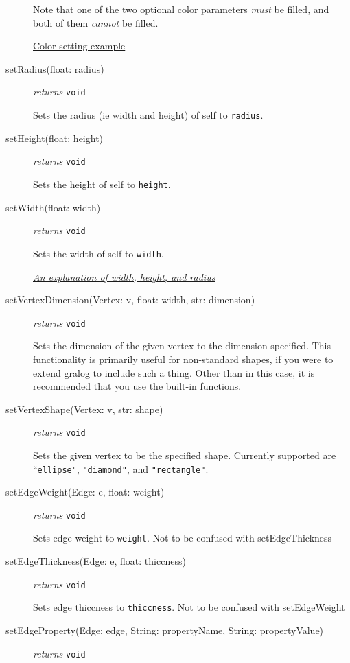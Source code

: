 \documentclass{article}
\newcounter{example}
\begin{document}
\begin{description}
Note that one of the two optional color parameters \textit{must} be filled, and both of them \textit{cannot} be filled.

\hyperref[colorNamesSupportedByGralog]{Color setting example}

\item[setRadius(float: radius)] \emph{returns}
  \texttt{void}

Sets the radius (ie width and height) of self to \texttt{radius}.

\item[setHeight(float: height)] \emph{returns}
  \texttt{void}

Sets the height of self to \texttt{height}.

\item[setWidth(float: width)] \emph{returns}
  \texttt{void}

Sets the width of self to \texttt{width}. 

\hyperref[radiusWidthHeightDiagram]{\textit{An explanation of width, height, and radius}}

  
\item[setVertexDimension(Vertex: v, float: width, str: dimension)]
  \emph{returns} \texttt{void}

Sets the dimension of the given vertex to the dimension specified. This functionality is primarily useful for non-standard shapes, if you were to extend gralog to include such a thing. Other than in this case, it is recommended that you use the built-in functions.

\item[setVertexShape(Vertex: v, str: shape)] \emph{returns} \texttt{void}

Sets the given vertex to be the specified shape. Currently supported
are ``\texttt{ellipse"}, \texttt{"diamond"}, and \texttt{"rectangle"}.

\item[setEdgeWeight(Edge: e, float: weight)] \emph{returns} \texttt{void}

Sets edge weight to \texttt{weight}. Not to be confused with setEdgeThickness

\item[setEdgeThickness(Edge: e, float: thiccness)] \emph{returns} \texttt{void}

Sets edge thiccness to \texttt{thiccness}. Not to be confused with setEdgeWeight

\item[setEdgeProperty(Edge: edge, String: propertyName, String: propertyValue)] \emph{returns} \texttt{void}


\end{description}
\end{document}
